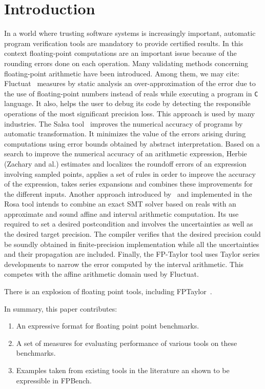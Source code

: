\documentclass[main.tex]{subfiles}
\begin{document}
\section{Introduction}
\label{sec:intro}


In a world where trusting software systems is increasingly important, automatic program verification tools are mandatory to provide certified results. In this context floating-point computations are an important issue because of the rounding errors done
on each operation. 
Many validating methods concerning floating-point arithmetic have been introduced.  
Among them, we may cite: 
Fluctuat~\cite{GMP06,Gou13} measures by static analysis an over-approximation of the error due to the use of floating-point numbers instead of reals while executing a program in \texttt{C} language.  
It also, helps the user to debug its code by detecting  the responsible operations of the most significant precision loss. 
This approach is used by many industries.    
The Salsa tool~\cite{fmics15} improves the numerical accuracy of programs by automatic transformation. 
It minimizes the value of the errors arising during computations using error bounds obtained by abstract interpretation.
Based on a search to improve the numerical accuracy of an arithmetic expression, Herbie~\cite{pavel} (Zachary and al.) estimates and localizes the roundoff errors of an expression involving sampled points, applies a set of rules in order to improve the accuracy of the expression, takes series expansions and combines these improvements for the different inputs.  
Another approach introduced by~\cite{DarulovaK14} and implemented in the Rosa tool intends to combine an exact SMT solver based on reals with an approximate and sound affine and interval arithmetic computation. 
Its use required to set a desired postcondition and involves the uncertainties as well as the desired target precision. 
The compiler verifies that the desired precision could be soundly obtained in finite-precision implementation while all the uncertainties and their propagation are included. Finally, the FP-Taylor tool uses Taylor series developments to narrow
the error computed by the interval arithmetic. This competes with the affine arithmetic domain used by Fluctuat.





There is an explosion of floating point tools, including
FPTaylor~\cite{fptaylor-fm15}.

In summary, this paper contributes:
%
\begin{enumerate}
%
  \item An expressive format for floating point point benchmarks.
%
  \item A set of measures for evaluating performance of various tools on
  these benchmarks.
%
  \item Examples taken from existing tools in the literature an shown to be
  expressible in FPBench.
%
\end{enumerate}
\end{document}
